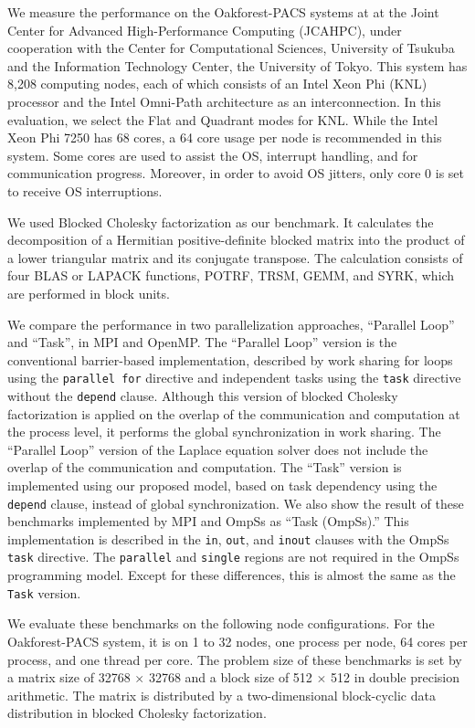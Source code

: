 ﻿\documentclass[graybox]{svmult}
\begin{document}
We measure the performance on the Oakforest-PACS \cite{OFP} systems at 
at the Joint Center for Advanced High-Performance Computing (JCAHPC), under cooperation with the Center for Computational Sciences, University of Tsukuba and the Information Technology Center, the University of Tokyo. 
This system has 8,208 computing nodes, each of which consists of an Intel Xeon Phi (KNL) processor and the Intel Omni-Path architecture as an interconnection.
In this evaluation, we select the Flat and Quadrant modes for KNL. While the Intel Xeon Phi 7250 has 68 cores, a 64 core usage per node is recommended in this system. Some cores are used to assist the OS, interrupt handling, and for communication progress. Moreover, in order to avoid OS jitters, only core 0 is set to receive OS interruptions. 

We used Blocked Cholesky factorization as our benchmark.
It calculates the decomposition of a Hermitian positive-definite blocked matrix into the product of a lower triangular matrix and its conjugate transpose. The calculation consists of four BLAS or LAPACK functions, POTRF, TRSM, GEMM, and SYRK, which are performed in block units.

We compare the performance in two parallelization approaches, ``Parallel Loop'' and ``Task'', in MPI and OpenMP. The ``Parallel Loop'' version is the conventional barrier-based implementation, described by work sharing for loops using the {\tt parallel for} directive and independent tasks using the {\tt task} directive without the {\tt depend} clause. Although this version of blocked Cholesky factorization is applied on the overlap of the communication and computation at the process level, it performs the global synchronization in work sharing. The ``Parallel Loop'' version of the Laplace equation solver does not include the overlap of the communication and computation. The ``Task'' version is implemented using our proposed model, based on task dependency using the {\tt depend} clause, instead of global synchronization.
We also show the result of these benchmarks implemented by MPI and OmpSs as ``Task (OmpSs).'' This implementation is described in the {\tt in}, {\tt out}, and {\tt inout} clauses with the OmpSs {\tt task} directive. The {\tt parallel} and {\tt single} regions are not required in the OmpSs programming model. Except for these differences, this is almost the same as the {\tt Task} version.

We evaluate these benchmarks on the following node configurations. For the Oakforest-PACS system, it is on 1 to 32 nodes, one process per node, 64 cores per process, and one thread per core.
The problem size of these benchmarks is set by a matrix size of 32768 $\times$ 32768 and a block size of 512 $\times$ 512 in double precision arithmetic. The matrix is distributed by a two-dimensional block-cyclic data distribution in blocked Cholesky factorization.
\end{document}
